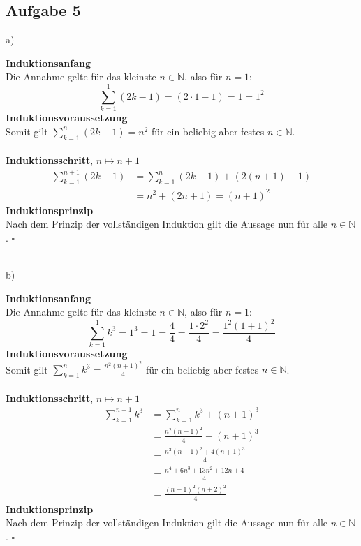 \documentclass[a4paper,graphics,11pt]{article}
\newcommand\aufgabe[1]{\subsection*{Aufgabe #1}}
\begin{document}
\vfill

\aufgabe{5}
a)

\begin{minipage}{0.05\linewidth}
    \qquad
\end{minipage}
\begin{minipage}{1\linewidth}
        \textbf{Induktionsanfang}\\
        Die Annahme gelte für das kleinste $n\in \mathbb{N}$, also für $n=1$:
        $$
            \sum_{k=1}^{1}(2k-1) = (2 \cdot 1 -1) = 1 = 1^2
        $$
        \textbf{Induktionsvoraussetzung}\\
        Somit gilt $\displaystyle\sum_{k=1}^{n} (2k-1) = n^2$ für ein beliebig aber festes $n \in \mathbb{N}$.\\\\
        \textbf{Induktionsschritt}, $n \mapsto n+1$ \\
        \begin{align*}
            \sum_{k=1}^{n+1}(2k-1) &= \sum_{k=1}^{n}(2k-1) +(2(n+1)-1) \\[1em]
            &= n^2 + (2n+1) = (n+1)^2
        \end{align*}
        \textbf{Induktionsprinzip}\\
        Nach dem Prinzip der vollständigen Induktion gilt die Aussage nun für alle
        $n \in \mathbb{N}$. \hfill$\square$

\end{minipage}\\

b)

\begin{minipage}{0.05\linewidth}
    \qquad
\end{minipage}
\begin{minipage}{1\linewidth}
        \textbf{Induktionsanfang}\\
        Die Annahme gelte für das kleinste $n\in \mathbb{N}$, also für $n=1$:
        $$
            \sum_{k=1}^{1}k^3 = 1^3 = 1 = \frac{4}{4} = \frac{1\cdot 2^2}{4} = \frac{1^2(1+1)^2}{4}
        $$
        \textbf{Induktionsvoraussetzung}\\[.5em]
        Somit gilt $\displaystyle\sum_{k=1}^{n} k^3 = \frac{n^2(n+1)^2}{4}$ für ein beliebig aber festes $n \in \mathbb{N}$.\\\\
        \textbf{Induktionsschritt}, $n \mapsto n+1$
        \begin{align*}
            \sum_{k=1}^{n+1}k^3 &= \sum_{k=1}^{n}k^3 + (n+1)^3 \\[.3em]
            &= \frac{n^2(n+1)^2}{4} + (n+1)^3 \\[.3em]
            &= \frac{n^2(n+1)^2+4(n+1)^3}{4} \\[.4em]
            &= \frac{n^4+6n^3+13n^2+12n+4}{4}\\[.4em]
            &= \frac{(n+1)^2(n+2)^2}{4}
        \end{align*}
        \textbf{Induktionsprinzip}\\
        Nach dem Prinzip der vollständigen Induktion gilt die Aussage nun für alle
        $n \in \mathbb{N}$. \hfill$\square$

\end{minipage}
\end{document}
